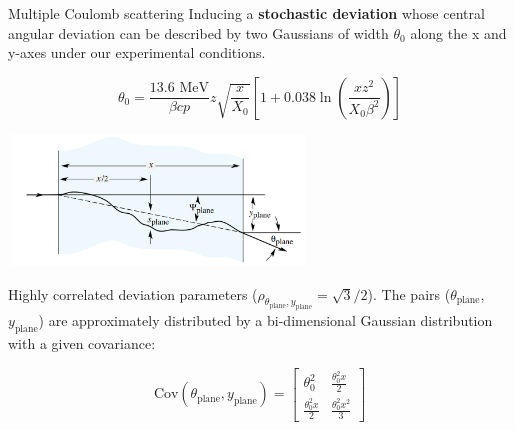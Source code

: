 \documentclass[8 pt]{beamer}
\begin{document}
\begin{frame}{Multiple Coulomb scattering}
\justifying
Inducing a \alert{\textbf{stochastic deviation}} whose central angular deviation can be described by two Gaussians of width $\theta_0$ along the x and y-axes under our experimental conditions.

\begin{equation*}
\label{eq:Moliere}
\theta_0 = \frac{13.6 \text{ MeV}}{\beta c p} z \sqrt{\frac{x}{X_0}} \left [1 + 0.038 \ln \left (\frac{x z^2}{X_0 \beta^2} \right ) \right ]
\end{equation*}

\begin{center}
\includegraphics[width=8cm, height=3.5cm]{figs/moliere.png}
\end{center} \vfill

Highly correlated deviation parameters ($\rho_{\theta_\text{plane}, y_\text{plane}}=\sqrt{3}/2$). The pairs ($\theta_\text{plane}$, $y_\text{plane}$) are approximately distributed by a bi-dimensional Gaussian distribution with a given covariance:

\begin{equation}
\text{Cov}(\theta_\text{plane}, y_\text{plane}) = \begin{bmatrix}
\theta^2_0 & \frac{\theta_0^2x}{2} \\
\frac{\theta_0^2x}{2} & \frac{\theta_0^2x^2}{3} 
\end{bmatrix}
\end{equation} \vfill
\end{frame}
\end{document}
